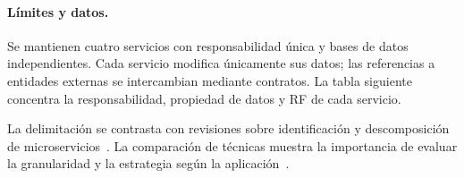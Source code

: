 \paragraph{Límites y datos.}
Se mantienen cuatro servicios con responsabilidad única y bases de datos
independientes. Cada servicio modifica únicamente sus datos; las referencias
a entidades externas se intercambian mediante contratos. La tabla siguiente
concentra la responsabilidad, propiedad de datos y RF de cada servicio.


La delimitación se contrasta con revisiones sobre identificación y
descomposición de microservicios~\cite{abgaz2023decomposition,oumoussa2024evolution}.
La comparación de técnicas muestra la importancia de evaluar la granularidad
y la estrategia según la aplicación~\cite{wang2024decomposition}.
